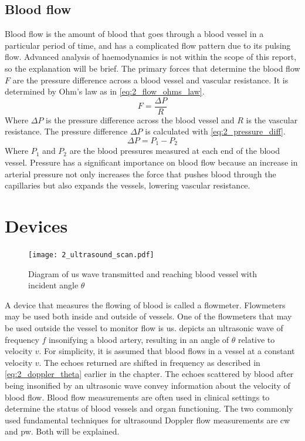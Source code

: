 \subsection{Blood flow}
Blood flow is the amount of blood that goes through a blood vessel in a particular period of time, and has a complicated flow pattern due to its pulsing flow. Advanced analysis of haemodynamics is not within the scope of this report, so the explanation will be brief. The primary forces that determine the blood flow $F$ are the pressure difference across a blood vessel and vascular resistance. It is determined by Ohm's law as in \cref{eq:2_flow_ohms_law}.
\begin{equation} \label{eq:2_flow_ohms_law}
	F = \frac{\Delta P}{R}
\end{equation}
Where $\Delta P$ is the pressure difference across the blood vessel and $R$ is the vascular resistance. The pressure difference $\Delta P$ is calculated with \cref{eq:2_pressure_diff}.
\begin{equation} \label{eq:2_pressure_diff}
	\Delta P = P_{1}-P_{2}
\end{equation}
Where $P_{1}$ and $P_{2}$ are the blood pressures measured at each end of the blood vessel. Pressure has a significant importance on blood flow because an increase in arterial pressure not only increases the force that pushes blood through the capillaries but also expands the vessels, lowering vascular resistance.

\section{Devices}
\begin{figure}[ht]
	\centering
	\texttt{[image: 2\_ultrasound\_scan.pdf]}
	\caption[Diagram of ultrasound wave transmitted and reaching blood vessel with incident angle $\theta$]{Diagram of \gls{us} wave transmitted and reaching blood vessel with incident angle $\theta$ \cite{ShungUltrasound_Book}}
	\label{fig:2_ultrasound_flow_scan}
\end{figure}

A device that measures the flowing of blood is called a flowmeter. Flowmeters may be used both inside and outside of vessels. One of the flowmeters that may be used outside the vessel to monitor flow is \gls{us}.  depicts an ultrasonic wave of frequency $f$ insonifying a blood artery, resulting in an angle of $\theta$ relative to velocity $v$. For simplicity, it is assumed that blood flows in a vessel at a constant velocity $v$. The echoes returned are shifted in frequency as described in \cref{eq:2_doppler_theta} earlier in the chapter. The echoes scattered by blood after being insonified by an ultrasonic wave convey information about the velocity of blood flow. Blood flow measurements are often used in clinical settings to determine the status of blood vessels and organ functioning. The two commonly used fundamental techniques for ultrasound Doppler flow measurements are \gls{cw} and \gls{pw}. Both will be explained.

